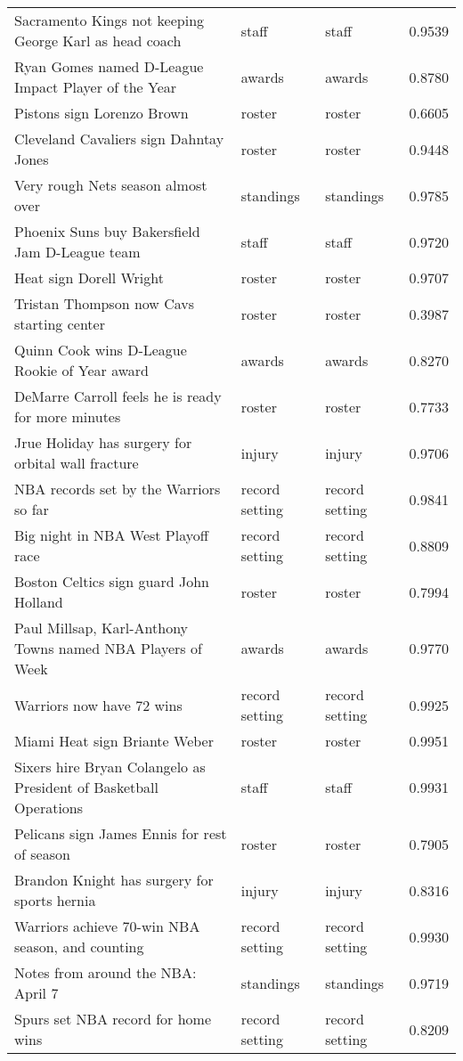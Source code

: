 \begin{table}[!htbp]
\begin{center}
\begin{tabular}{ l l l l}
Sacramento Kings not keeping George Karl as head coach & staff & staff & 0.9539\\
Ryan Gomes named D-League Impact Player of the Year & awards & awards & 0.8780\\
Pistons sign Lorenzo Brown & roster & roster & 0.6605\\
Cleveland Cavaliers sign Dahntay Jones & roster & roster & 0.9448\\
Very rough Nets season almost over & standings & standings & 0.9785\\
Phoenix Suns buy Bakersfield Jam D-League team & staff & staff & 0.9720\\
Heat sign Dorell Wright & roster & roster & 0.9707\\
Tristan Thompson now Cavs starting center & roster & roster & 0.3987\\
Quinn Cook wins D-League Rookie of Year award & awards & awards & 0.8270\\
DeMarre Carroll feels he is ready for more minutes & roster & roster & 0.7733\\
Jrue Holiday has surgery for orbital wall fracture & injury & injury & 0.9706\\
NBA records set by the Warriors so far & record setting & record setting & 0.9841\\
Big night in NBA West Playoff race & record setting & record setting & 0.8809\\
Boston Celtics sign guard John Holland & roster & roster & 0.7994\\
Paul Millsap, Karl-Anthony Towns named NBA Players of Week & awards & awards & 0.9770\\
Warriors now have 72 wins & record setting & record setting & 0.9925\\
Miami Heat sign Briante Weber & roster & roster & 0.9951\\
Sixers hire Bryan Colangelo as President of Basketball Operations & staff & staff & 0.9931\\
Pelicans sign James Ennis for rest of season & roster & roster & 0.7905\\
Brandon Knight has surgery for sports hernia & injury & injury & 0.8316\\
Warriors achieve 70-win NBA season, and counting & record setting & record setting & 0.9930\\
Notes from around the NBA: April 7 & standings & standings & 0.9719\\
Spurs set NBA record for home wins & record setting & record setting & 0.8209\\

\end{tabular}
\end{center}
\end{table}
